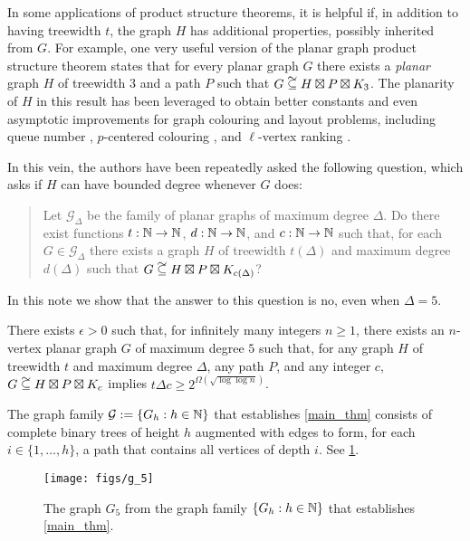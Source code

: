 \documentclass{patmorin}
\newcommand\subsetcong{\mathrel{\text{%
    \setbox0\hbox{$\subseteq$}%
    \rlap{\hbox to \wd0{\hss\hss\hss\raisebox{1.5\height}{$\sim$}\hss}}\box0
}}}
\renewcommand{\ge}{\geqslant}
\begin{document}
In some applications of product structure theorems, it is helpful if, in addition to having treewidth $t$, the graph $H$ has additional properties, possibly inherited from $G$.  For example, one very useful version of the planar graph product structure theorem states that for every planar graph $G$ there exists a \emph{planar} graph $H$ of treewidth $3$ and a path $P$ such that $G\subsetcong H\boxtimes P\boxtimes K_3$.  The planarity of $H$ in this result has been leveraged to obtain better constants and even asymptotic improvements for graph colouring and layout problems, including queue number \cite{dujmovic.joret.ea:planar}, $p$-centered colouring \cite{debski.felsner.ea:improved}, and $\ell$-vertex ranking \cite{bose.dujmovic.ea:asymptotically}.

In this vein, the authors have been repeatedly asked the following question, which asks if $H$ can have bounded degree whenever $G$ does:
\begin{quote}
  Let $\mathcal{G}_\Delta$ be the family of planar graphs of maximum degree $\Delta$.  Do there exist functions $t:\mathbb{N}\to\mathbb{N}$, $d:\mathbb{N}\to\mathbb{N}$, and $c:\mathbb{N}\to\mathbb{N}$ such that, for each $G\in\mathcal{G}_\Delta$ there exists a graph $H$ of treewidth $t(\Delta)$ and maximum degree $d(\Delta)$ such that $G\subsetcong H\boxtimes P\boxtimes K_{c(\Delta)}$?
\end{quote}
In this note we show that the answer to this question is no, even when $\Delta=5$.

\begin{thm}\label{main_thm}
  There exists $\epsilon > 0$ such that, for infinitely many integers $n\ge 1$, there exists an $n$-vertex planar graph $G$ of maximum degree $5$ such that, for any graph $H$ of treewidth $t$ and maximum degree $\Delta$, any path $P$, and any integer $c$, $G\subsetcong H\boxtimes P\boxtimes K_c$ implies $t\Delta c \ge 2^{\Omega(\sqrt{\log\log n})}$.
\end{thm}

The graph family $\mathcal{G}:=\{G_h:h\in\mathbb{N}\}$ that establishes \cref{main_thm} consists of complete binary trees of height $h$ augmented with edges to form, for each $i\in\{1,\ldots,h\}$, a path that contains all vertices of depth $i$.  See \cref{G_5}.

\begin{figure}
  \begin{center}
    \texttt{[image: figs/g\_5]}
  \end{center}
  \caption{The graph $G_5$ from the graph family $\{G_h:h\in\mathbb{N}\}$ that establishes \cref{main_thm}.}
  \label{G_5}
\end{figure}
\end{document}
